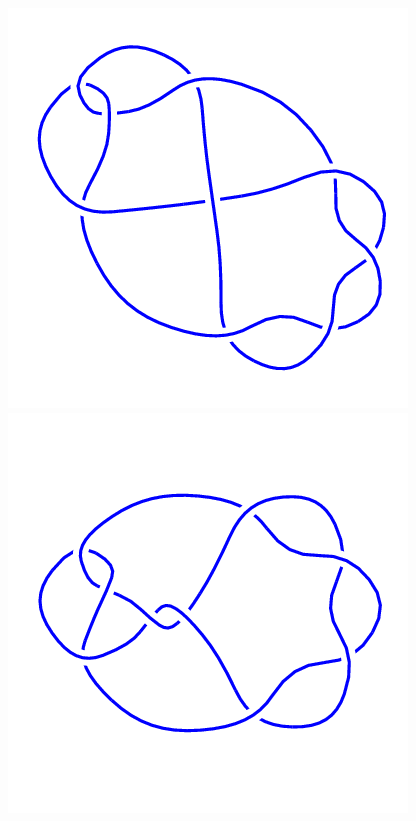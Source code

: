\begin{figure}[H]
    \begin{minipage}[b]{.18\linewidth}
        \centering
        \includegraphics[width=\linewidth]{../data/9_11.png}
    \end{minipage}
    \begin{minipage}[b]{.18\linewidth}
        \centering
        \includegraphics[width=\linewidth]{../data/9_12.png}

\end{minipage}
\end{figure}
